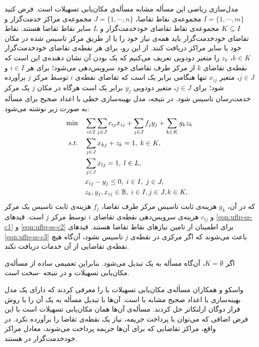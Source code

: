 مدل‌سازی ریاضی این مسأله  مشابه مسأله‌ی مکان‌یابی  تسهیلات است. فرض کنید $I=\{1,\cdots,m\}$ مجموعه‌ی نقاط تقاضا، $J=\{1,\cdots,n\}$ مجموعه‌ی مراکز خدمت‌گزار و $K\subseteq I$ مجموعه‌ی نقاط تقاضای خودخدمت‌گزار و  $L$ سایر نقاط تقاضا هستند. نقاط تقاضای خودخدمت‌گزار باید همه‌ی نیاز خود را یا از طریق مرکز تاسیس شده در مکان خود یا سایر مراکز دریافت کنند. از این رو، برای هر نقطه‌ی تقاضای خودخدمت‌گزار $k\in K$،  $z_{k}$ را متغیر دودویی تعریف می‌کنیم که یک بودن آن نشان دهنده‌ی این است که نقطه‌ی تقاضای $k$ از مرکز  طرف تقاضای خود سرویس‌دهی می‌شود؛ برای هر $i\in I$ و $j\in J$، متغیر $x_{ij}$ تنها هنگامی برابر یک است که تقاضای نقطه‌ی $i$ توسط مرکز $j$ برآورده شود؛  برای  $j\in J$، متغیر دودویی $y_j$ برابر یک است هرگاه در مکان $j$ یک مرکز خدمت‌رسان تاسیس شود. در نتیجه، مدل بهینه‌سازی خطی با اعداد صحیح برای مسأله به صورت زیر نوشته می‌شود:
 \begin{align}
 \min  \quad    & \sum_{i\in I}\sum_{j\in J} c_{ij}x_{ij} +  \sum_{j\in J} f_j y_j + \sum_{k\in K} g_kz_k   \label{eqn:uflp-ss-obj}\\
 s. t. \quad      & \sum_{j\in J} x_{kj} + z_k = 1 ,  \; k\in K, \label{eqn:uflp-ss-c1}\\
                & \sum_{j\in J}  x_{lj} = 1 ,  \; l\in L, \label{eqn:uflp-ss-c2}\\
                & x_{ij} - y_j \leq 0,  \; i\in I, \; j\in J, \label{eqn:uflp-ss-c3}\\
                & z_k,y_j, x_{ij} \in \mathbb{B},\; i\in I, j\in J, k\in K,  \label{eqn:uflp-ss-bin-const}
 \end{align}
که در آن،  $g_k$ هزینه‌ی ثابت تاسیس مرکز طرف تقاضا، $f_j$ هزینه‌ی ثابت تاسیس یک مرکز و $c_{ij}$ هزینه‌ی سرویس‌دهی نقطه‌ی تقاضای $i$ توسط مرکز $j$ است. قید‌های \eqref{eqn:uflp-ss-c1} و  \eqref{eqn:uflp-ss-c2}   برای اطمینان از تامین نیازهای نقاط تقاضا هستند. قید‌های \eqref{eqn:uflp-ss-c3}   باعث می‌شوند که اگر مرکزی در نقطه‌ی $j$ تاسیس نشود، آن‌گاه هیچ نقطه‌ی تقاضایی از آن خدمات دریافت نکند. 

اگر $K=\emptyset$، آن‌گاه مسأله به یک  تبدیل می‌شود. بنابراین  تعمیمی ساده از مسأله‌ی مکان‌یابی  تسهیلات و در نتیجه  -سخت
 است.

واسکو و همکاران \cite{VNSW2003} مسأله‌ی مکان‌یابی تسهیلات با   را معرفی کردند که دارای یک مدل بهینه‌سازی با اعداد صحیح مشابه با  است. آن‌ها با تبدیل مسأله به یک  آن را با روش فراز دوگان ارلنکاتر حل کردند. مسأله‌ی آن‌ها همان مکان‌یابی  تسهیلات است با این فرض اضافی که می‌توان با پرداخت جریمه، نیاز یک نقطه‌ی تقاضا را برآورده نکرد. در واقع، مراکز تقاضایی که برای آن‌ها جریمه پرداخت می‌شوند، معادل مراکز خودخدمت‌گزار در  هستند. 


